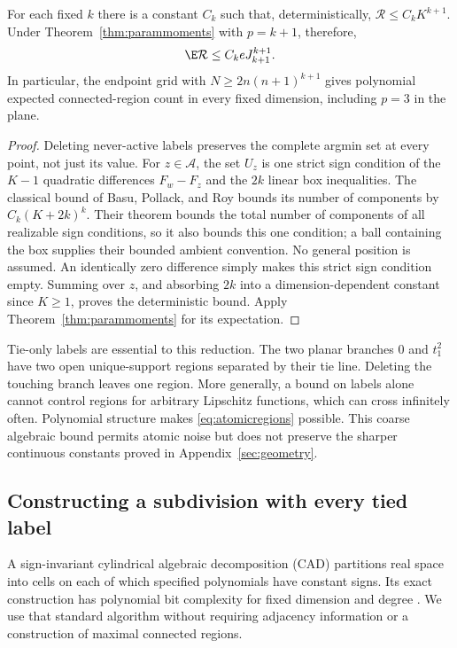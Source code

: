 \begin{corollary}\label{cor:atomicregions}
For each fixed $k$ there is a constant $C_k$ such that, deterministically,
$\mathcal R\le C_kK^{k+1}$. Under Theorem~\ref{thm:parammoments} with
$p=k+1$, therefore,
\begin{equation}\label{eq:atomicregions}
 \E\mathcal R\le C_keJ_{k+1}^{k+1}.
\end{equation}
In particular, the endpoint grid with
$N\ge2n(n+1)^{k+1}$ gives polynomial expected connected-region count
in every fixed dimension, including $p=3$ in the plane.
\end{corollary}
\begin{proof}
Deleting never-active labels preserves the complete argmin set at every
point, not just its value. For $z\in\mathcal A$, the set $U_z$ is one
strict sign condition of the $K-1$ quadratic differences $F_w-F_z$
and the $2k$ linear box inequalities. The classical bound of Basu, Pollack,
and Roy \cite[Theorem~5.1]{BasuSigns} bounds its number of components by
$C_k(K+2k)^k$. Their theorem bounds the total number of components of all
realizable sign conditions, so it also bounds this one condition; a ball
containing the box supplies their bounded ambient convention. No general
position is assumed. An identically zero difference simply makes this
strict sign condition empty. Summing over $z$, and absorbing $2k$ into
a dimension-dependent constant since $K\ge1$, proves the deterministic
bound. Apply Theorem~\ref{thm:parammoments} for its expectation.
\end{proof}

Tie-only labels are essential to this reduction. The two planar branches
$0$ and $t_1^2$ have two open unique-support regions separated by their tie
line. Deleting the touching branch leaves one region. More generally, a
bound on labels alone cannot control regions for arbitrary Lipschitz
functions, which can cross infinitely often. Polynomial structure makes
\eqref{eq:atomicregions} possible. This coarse algebraic bound permits atomic
noise but does not preserve the sharper continuous constants proved in
Appendix~\ref{sec:geometry}.

\subsection{Constructing a subdivision with every tied label}
A sign-invariant cylindrical algebraic decomposition (CAD) partitions real
space into cells on each of which specified polynomials have constant signs.
Its exact construction has polynomial bit complexity for fixed dimension
and degree \cite[Introduction]{ArnonCAD}. We use that standard algorithm
without requiring adjacency information or a construction of maximal
connected regions.

